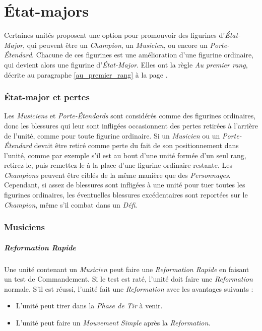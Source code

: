 
\part{État-majors}
\label{etat_majors}

Certaines unités proposent une option pour promouvoir des figurines d'\emph{État-Major}, qui peuvent être un \emph{Champion}, un \emph{Musicien}, ou encore un \emph{Porte-Étendard}. Chacune de ces figurines est une amélioration d'une figurine ordinaire, qui devient alors une figurine d'\emph{État-Major}. Elles ont la règle \emph{Au premier rang}, décrite au paragraphe \ref{au_premier_rang} à la page \pageref{au_premier_rang}.

\section{État-major et pertes}

Les \emph{Musiciens} et \emph{Porte-Étendards} sont considérés comme des figurines ordinaires, donc les blessures qui leur sont infligées occasionnent des pertes retirées à l'arrière de l'unité, comme pour toute figurine ordinaire. Si un \emph{Musicien} ou un \emph{Porte-Étendard} devait être retiré comme perte du fait de son positionnement dans l'unité, comme par exemple s'il est au bout d'une unité formée d'un seul rang, retirez-le, puis remettez-le à la place d'une figurine ordinaire restante. Les \emph{Champions} peuvent être ciblés de la même manière que des \emph{Personnages}. Cependant, si assez de blessures sont infligées à une unité pour tuer toutes les figurines ordinaires, les éventuelles blessures excédentaires sont reportées sur le \emph{Champion}, même s'il combat dans un \emph{Défi}.

\section{Musiciens}

\subsubsection*{Reformation Rapide}

Une unité contenant un \emph{Musicien} peut faire une \emph{Reformation Rapide} en faisant un test de Commandement. Si le test est raté, l'unité doit faire une \emph{Reformation} normale. S'il est réussi, l'unité fait une \emph{Reformation} avec les avantages suivants :
\begin{itemize}[label={-}]
\item L'unité peut tirer dans la \emph{Phase de Tir} à venir.
\item L'unité peut faire un \emph{Mouvement Simple} après la \emph{Reformation}.
\end{itemize}

